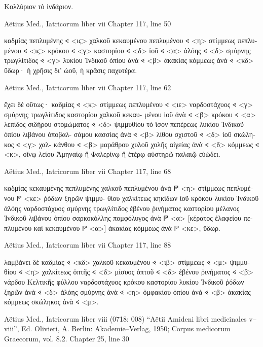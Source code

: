 \documentclass[12pt,letterpaper,twoside,final]{memoir}
\begin{document}
\begin{greek}
Κολλύριον τὸ ἰνδάριον. 



Aëtius Med., Iatricorum liber vii 
Chapter 117, line 50

                                                   καδμίας πεπλυμένης 𐅻 <ιϛ> 
χαλκοῦ κεκαυμένου πεπλυμένου 𐅻 <η> στίμμεως πεπλυμένου 𐅻 <ιϛ> κρόκου 
𐅻 <γ> καστορίου 𐅻 <δ> ἰοῦ 𐅻 <α> ἀλόης 𐅻 <δ> σμύρνης τρωγλίτιδος 𐅻 <γ> 
λυκίου Ἰνδικοῦ ὀπίου ἀνὰ 𐅻 <β> ἀκακίας κόμμεως ἀνὰ 𐅻 <κδ> ὕδωρ· ἡ 
χρῆσις δι' ὠοῦ, ἡ κρᾶσις παχυτέρα. 



Aëtius Med., Iatricorum liber vii 
Chapter 117, line 62

                     ἔχει δὲ οὕτως· καδμίας 𐅻 <κ> στίμμεως πεπλυμένου 
𐅻 <ιε> ναρδοστάχυος 𐅻 <γ> σμύρνης τρωγλίτιδος καστορίου χαλκοῦ κεκαυ-  
μένου ἰοῦ ἀνὰ 𐅻 <β> κρόκου 𐅻 <α> λεπίδος σιδήρου στομώματος 𐅻 <δ> 
ψιμμυθίου τὸ ἴσον πεπέρεως λυκίου Ἰνδικοῦ ὀπίου λιβάνου ὀποβαλ-
σάμου κασσίας ἀνὰ 𐅻 <β> λίθου σχιστοῦ 𐅻 <δ> ἰοῦ σκώληκος 𐅻 <γ> χαλ-
κάνθου 𐅻 <β> μαράθρου χυλοῦ χολῆς αἰγείας ἀνὰ 𐅻 <δ> κόμμεως 𐅻 <κ>, 
οἴνῳ λείου Ἀμηναίῳ ἢ Φαλερίνῳ ἢ ἑτέρῳ αὐστηρῷ παλαιῷ εὐώδει. 



Aëtius Med., Iatricorum liber vii 
Chapter 117, line 68

                                   καδμίας κεκαυμένης πεπλυμένης χαλκοῦ 
πεπλυμένου ἀνὰ 𐆄 <η> στίμμεως πεπλυμένου 𐆄 <κε> ῥόδων ξηρῶν ψιμμυ-
θίου χαλκίτεως κηκίδων ἰοῦ κρόκου λυκίου Ἰνδικοῦ ἀλόης ναρδοστάχυος 
σμύρνης τρωγλίτιδος ἐβένου ῥινήματος καστορίου μέλανος Ἰνδικοῦ 
λιβάνου ὀπίου σαρκοκόλλης πομφόλυγος ἀνὰ 𐆄 <α> [κέρατος ἐλαφείου 
πεπλυμένου καὶ κεκαυμένου 𐆄 <α>] ἀκακίας κόμμεως ἀνὰ 𐆄 <κε>, ὕδωρ. 



Aëtius Med., Iatricorum liber vii 
Chapter 117, line 88

                                                 λαμβάνει δὲ καδμίας 𐅻 <κδ> χαλκοῦ 
κεκαυμένου 𐅻 <ιβ> στίμμεως 𐅻 <μ> ψιμμυθίου 𐅻 <η> χαλκίτεως ὀπτῆς 𐅻 <δ> 
μίσυος ὀπτοῦ 𐅻 <δ> ἐβένου ῥινήματος 𐅻 <β> νάρδου Κελτικῆς φύλλου 
ναρδοστάχυος κρόκου καστορίου λυκίου Ἰνδικοῦ ῥόδων ξηρῶν ἀνὰ 𐅻 <δ> 
ἀλόης σμύρνης ἀνὰ 𐅻 <η> ὀμφακίου ὀπίου ἀνὰ 𐅻 <β> ἀκακίας κόμμεως 
σκώληκος ἀνὰ 𐅻 <μ>. 



Aëtius Med., Iatricorum liber viii (0718: 008)
“Aëtii Amideni libri medicinales v–viii”, Ed. Olivieri, A.
Berlin: Akademie–Verlag, 1950; Corpus medicorum Graecorum, vol. 8.2.
Chapter 25, line 30


\end{greek}
\end{document}
